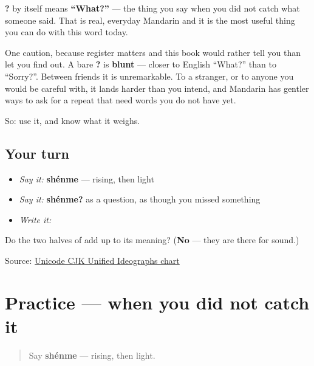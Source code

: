 \begin{culture}
\textbf{?} by itself means \textbf{\textquotedblleft{}What?\textquotedblright{}} — the thing you say when you did not catch what someone said. That is real, everyday Mandarin and it is the most useful thing you can do with this word today.

One caution, because register matters and this book would rather tell you than let you find out. A bare \textbf{?} is \textbf{blunt} — closer to English \textquotedblleft{}What?\textquotedblright{} than to \textquotedblleft{}Sorry?\textquotedblright{}. Between friends it is unremarkable. To a stranger, or to anyone you would be careful with, it lands harder than you intend, and Mandarin has gentler ways to ask for a repeat that need words you do not have yet.

So: use it, and know what it weighs.
\end{culture}

\subsection*{Your turn}
\begin{itemize}
\raggedright
  \item \emph{Say it:} \textbf{shénme} — rising, then light
  \item \emph{Say it:} \textbf{shénme?} as a question, as though you missed something
  \item \emph{Write it:} 
\end{itemize}

\begin{tcolorbox}[breakable,colback=teal!4,colframe=teal!35!black,title={Before you move on}]
Do the two halves of  add up to its meaning? (\textbf{No} — they are there for sound.)

Source: \href{https://www.unicode.org/charts/PDF/U4E00.pdf}{Unicode CJK Unified Ideographs chart}
\end{tcolorbox}
\section[Practice]{Practice — when you did not catch it}

\label{lesson:ZH-C09-practice}



\begin{quote}
Say \textbf{shénme} — rising, then light.
\end{quote}

